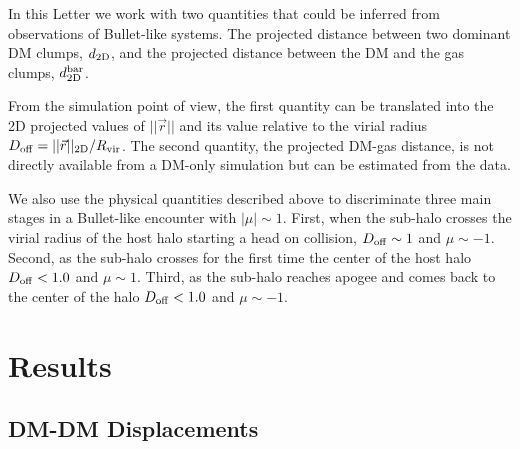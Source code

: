 \documentclass{emulateapj}
\begin{document}
In this Letter we work with two quantities that could be inferred
from observations of Bullet-like systems. The projected distance
between two dominant DM clumps, $d_{\rm 2D}$, and the projected distance
between the DM and the gas clumps, $d_{\rm 2D}^{\rm bar}$.

From the simulation point of view, the first quantity can be
translated into the 2D projected values of $||\vec{r}||$ and its value
relative to the virial radius $D_{\rm   off}= ||\vec{r}||_{\rm
  2D}/R_{\rm vir}$. The second quantity, the projected DM-gas
distance, is not directly available from a DM-only simulation but can
be estimated from the data.  

We also use the physical quantities described above to discriminate
three main stages in a Bullet-like encounter with $|\mu|\sim
1$. First, when the sub-halo crosses the virial radius of the host
halo starting a head on collision, $D_{\rm   off} \sim 1$ and $\mu\sim
-1$. Second, as the sub-halo crosses for the first time the center of
the host halo $D_{\rm off}<1.0$ and $\mu\sim 1$. Third, as the
sub-halo reaches apogee and comes back to the center of the halo
$D_{\rm off} < 1.0$ and $\mu\sim -1$.   


\section{Results}
\label{sec:results}

\subsection{DM-DM Displacements}
\label{fig:displacement}
\end{document}
